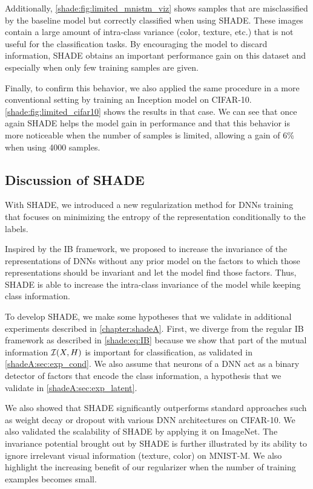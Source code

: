         Additionally, \autoref{shade:fig:limited_mnistm_viz} shows samples that are misclassified by the baseline model but correctly classified when using \ac{SHADE}. These images contain a large amount of intra-class variance (color, texture, etc.) that is not useful for the classification tasks. By encouraging the model to discard information, \ac{SHADE} obtains an important performance gain on this dataset and especially when only few training samples are given.
        
        Finally, to confirm this behavior, we also applied the same procedure in a more conventional setting by training an Inception model on CIFAR-10. \autoref{shade:fig:limited_cifar10} shows the results in that case. We can see that once again SHADE helps the model gain in performance and that this behavior is more noticeable when the number of samples is limited, allowing a gain of 6\% when using 4000 samples.

    \subsection{Discussion of SHADE}

    With \ac{SHADE}, we introduced a new regularization method for \acp{DNN} training that focuses on minimizing the entropy of the representation conditionally to the labels.
    
    Inspired by the \acf{IB} framework, we proposed to increase the invariance of the representations of \acp{DNN} without any prior model on the factors to which those representations should be invariant and let the model find those factors. Thus, \ac{SHADE} is able to increase the intra-class invariance of the model while keeping class information.

    To develop \ac{SHADE}, we make some hypotheses that we validate in additional experiments described in \autoref{chapter:shadeA}. First, we diverge from the regular \ac{IB} framework as described in \autoref{shade:eq:IB} because we show that part of the mutual information $\mathcal{I}(X,H)$ is important for classification, as validated in \autoref{shadeA:sec:exp_cond}. We also assume that neurons of a \ac{DNN} act as a binary detector of factors that encode the class information, a hypothesis that we validate in \autoref{shadeA:sec:exp_latent}.

    We also showed that \ac{SHADE} significantly outperforms standard approaches such as weight decay or dropout with various \ac{DNN} architectures on CIFAR-10. We also validated the scalability of \ac{SHADE} by applying it on ImageNet. 
    The invariance potential brought out by {SHADE} is further illustrated by its ability to ignore irrelevant visual information (texture, color) on MNIST-M. We also highlight the increasing benefit of our regularizer when the number of training examples becomes small.
 
